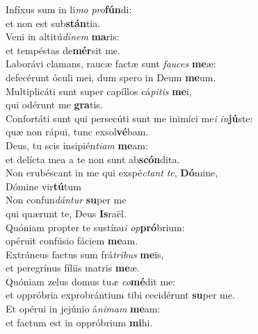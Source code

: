 \evenverse Infíxus sum in li\textit{mo} \textit{pro}\textbf{fún}di:~\*\\
\evenverse et non est sub\textbf{stán}tia.\\
\oddverse Veni in altitú\textit{di}\textit{nem} \textbf{ma}ris:~\*\\
\oddverse et tempéstas de\textbf{mér}sit me.\\
\evenverse Laborávi clamans, raucæ factæ sunt \textit{fau}\textit{ces} \textbf{me}æ:~\*\\
\evenverse defecérunt óculi mei, dum spero in Deum \textbf{me}um.\\
\oddverse Multiplicáti sunt super capíllos cá\textit{pi}\textit{tis} \textbf{me}i,~\*\\
\oddverse qui odérunt me \textbf{gra}tis.\\
\evenverse Confortáti sunt qui persecúti sunt me inimíci me\textit{i} \textit{in}\textbf{jú}ste:~\*\\
\evenverse quæ non rápui, tunc exsol\textbf{vé}bam.\\
\oddverse Deus, tu scis insipién\textit{ti}\textit{am} \textbf{me}am:~\*\\
\oddverse et delícta mea a te non sunt ab\textbf{scón}dita.\\
\evenverse Non erubéscant in me qui exspé\textit{ctant} \textit{te}, \textbf{Dó}mine,~\*\\
\evenverse Dómine vir\textbf{tú}tum\\
\oddverse Non confun\textit{dán}\textit{tur} \textbf{su}per me~\*\\
\oddverse qui quærunt te, Deus \textbf{Is}raël.\\
\evenverse Quóniam propter te sustínu\textit{i} \textit{op}\textbf{pró}brium:~\*\\
\evenverse opéruit confúsio fáciem \textbf{me}am.\\
\oddverse Extráneus factus sum frá\textit{tri}\textit{bus} \textbf{me}is,~\*\\
\oddverse et peregrínus fíliis matris \textbf{me}æ.\\
\evenverse Quóniam zelus domus tu\textit{æ} \textit{co}\textbf{mé}dit me:~\*\\
\evenverse et oppróbria exprobrántium tibi cecidérunt \textbf{su}per me.\\
\oddverse Et opérui in jejúnio á\textit{ni}\textit{mam} \textbf{me}am:~\*\\
\oddverse et factum est in oppróbrium \textbf{mi}hi.\\
